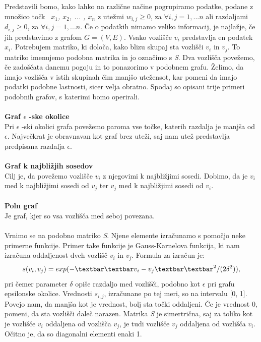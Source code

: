 \documentclass[a4paper, 10pt]{article}
\begin{document}
Predstavili bomo, kako lahko na različne načine pogrupiramo podatke, podane z množico točk \textsl{\ $x_1$, $x_2$, ... , $x_n$ } z utežmi $w_{i,j} \geq 0$, za $\forall i,j = 1, ... n$ ali razdaljami $d_{i,j} \geq 0$, za $\forall i,j = 1, ... n$. Če o podatkih nimamo veliko informacij, je najlažje, če jih predstavimo z grafom $G=(V, E)$. Vsako vozlišče $v_i$ predstavlja en podatek \textsl{$x_i$}. Potrebujem matriko, ki določa, kako blizu skupaj sta vozlišči $v_i$ in $v_j$. To matriko imenujemo podobna matrika in jo označimo s \textsl{S}. Dva vozlišča povežemo, če zadoščata danemu pogoju in to ponazorimo v podobnem grafu. Želimo, da imajo vozlišča v istih skupinah čim manjšo utežensot, kar pomeni da imajo podatki podobne lastnosti, sicer velja obratno. Spodaj so opisani trije primeri podobnih grafov, s katerimi bomo operirali.\\
\\
\textbf{Graf $\epsilon$ -ske okolice}\\
Pri $\epsilon$ -ski okolici grafa povežemo paroma vse točke, katerih razdalja je manjša od $\epsilon$. Največkrat je obravnavan kot graf brez uteži, saj nam utež predstavlja predpisana razdalja $\epsilon$.\\
\\
\textbf{Graf k najbližjih sosedov}\\
Cilj je, da povežemo vozlišče $v_i$ z njegovimi k najbližjimi sosedi. Dobimo, da je $v_i$ med k najbližjimi sosedi od $v_j$ ter $v_j$ med k najbližjimi sosedi od $v_i$.\\
\\
\textbf{Poln graf}\\
Je graf, kjer so vsa vozlišča med seboj povezana.\\
\\
Vrnimo se na podobno matriko \textsl{S}. Njene elemente izračunamo s pomočjo neke primerne funkcije. Primer take funkcije je Gauss-Karnelova funkcija, ki nam izračuna oddaljenost dveh vozlišč $v_i$ in $v_j$. Formula za izračun je:$$s(v_i, v_j) = exp(-\textbar\textbar v_i - v_j \textbar\textbar^2 / (2\delta^2)),$$pri čemer parameter $\delta$ opiše razdaljo med vozlišči, podobno kot $\epsilon$ pri grafu epsilonske okolice.  Vrednosti $s_{i,j}$, izračunane po tej meri, so na intervalu [0, 1]. Povejo nam, da manjša kot je vrednost, bolj sta točki oddaljeni. Če je vrednost 0, pomeni, da sta vozlišči daleč narazen. Matrika \textsl{S} je simertrična, saj za toliko kot je vozlišče $v_i$ oddaljena od vozlišča $v_j$, je tudi vozlišče $v_j$ oddaljena od vozlišča $v_i$. Očitno je, da so diagonalni elementi enaki 1.\\
\end{document}
